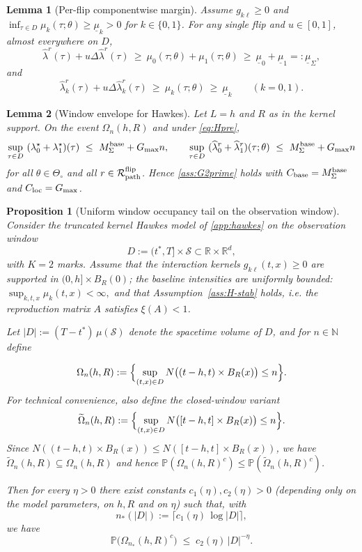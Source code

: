 \documentclass{statsoc}
\newtheorem{lemma}[lemma]{Lemma}
\newtheorem{proposition}[proposition]{Proposition}
\newcommand{\bbP}{\mathbb{P}}
\newcommand{\bbR}{\mathbb{R}}
\newcommand{\1}{\mathbbm{1}}
\newcommand{\bbN}{\mathbb{N}}
\begin{document}
\begin{lemma}[Per-flip componentwise margin]\label{lem:hawkes-margin}
Assume $g_{k\ell}\ge 0$ and $\inf_{\tau\in D}\mu_k(\tau;\theta)\ge \underline\mu_k>0$ for $k\in\{0,1\}$. For any single flip and $u\in[0,1]$, almost everywhere on $D$,
\[
\widehat\lambda^r(\tau)+u \Delta\widehat\lambda^r(\tau)\ \ge\ \mu_0(\tau;\theta)+\mu_1(\tau;\theta)\ \ge\ \underline\mu_0+\underline\mu_1=:\underline\mu_\Sigma,
\]
and
\[
\widehat\lambda_k^r(\tau)+u \Delta\widehat\lambda_k^r(\tau)\ \ge\ \mu_k(\tau;\theta)\ \ge\ \underline\mu_k\qquad (k=0,1).
\]
\end{lemma}

\begin{lemma}[Window envelope for Hawkes]\label{lem:hawkes-window}
Let $L=h$ and $R$ as in the kernel support. On the event $\Omega_{n}(h,R)$ and under \eqref{eq:Hpre},
\[
\sup_{\tau\in D}\ (\lambda_0^\star+\lambda_1^\star)(\tau)\ \le\ M_\Sigma^{\rm base}+G_{\max}n,\qquad
\sup_{\tau\in D}\ (\widehat\lambda_0^r+\widehat\lambda_1^r)(\tau;\theta)\ \le\ M_\Sigma^{\rm base}+G_{\max}n
\]
for all $\theta\in\Theta_\circ$ and all $r\in\mathcal R_{\rm path}^{\rm flip}$. Hence \cref{ass:G2prime} holds with $C_{\rm base}=M_\Sigma^{\rm base}$ and $C_{\rm loc}=G_{\max}$.
\end{lemma}

\begin{proposition}[Uniform window occupancy tail on the observation window]\label{prop:hawkes-tail}
Consider the truncated kernel Hawkes model of \cref{app:hawkes} on the observation window
\[
D := (t^\ast,T]\times\mathcal{S} \subset \bbR\times\bbR^d,
\]
with $K=2$ marks. Assume that the interaction kernels $g_{k\ell}(t,x)\ge 0$ are supported in $(0,h]\times B_R(0)$; the baseline intensities are uniformly bounded:
    \(
      \sup_{k,t,x}\mu_k(t,x) < \infty,
    \)
and that Assumption~\ref{ass:H-stab} holds, i.e. the reproduction matrix $A$ satisfies $\xi(A)<1$.

Let $|D|:=(T-t^\ast)\,\mu(\mathcal{S})$ denote the spacetime volume of $D$, and for $n\in\bbN$ define


\[
  \Omega_n(h,R)
  := \Bigl\{
      \sup_{(t,x)\in D}
      N\bigl((t-h,t)\times B_R(x)\bigr)\le n
    \Bigr\}.
\]
For technical convenience, also define the closed-window variant
\[
  \widetilde\Omega_n(h,R)
  := \Bigl\{
      \sup_{(t,x)\in D}
      N\bigl([t-h,t]\times B_R(x)\bigr)\le n
    \Bigr\}.
\]
Since \(N((t-h,t)\times B_R(x))\le N([t-h,t]\times B_R(x))\), we have \(\widetilde\Omega_n(h,R)\subseteq \Omega_n(h,R)\) and hence \(\bbP(\Omega_n(h,R)^c)\le \bbP(\widetilde\Omega_n(h,R)^c)\).

Then for every $\eta>0$ there exist constants $c_1(\eta),c_2(\eta)>0$ (depending only on the model parameters, on $h,R$ and on $\eta$) such that,
with
\[
  n_*(|D|) := \bigl\lceil c_1(\eta)\,\log|D| \bigr\rceil,
\]
we have
\[
  \bbP\bigl(\Omega_{n_*}(h,R)^c\bigr)
  \;\le\; c_2(\eta)\,|D|^{-\eta}.
\]
\end{proposition}
\end{document}

